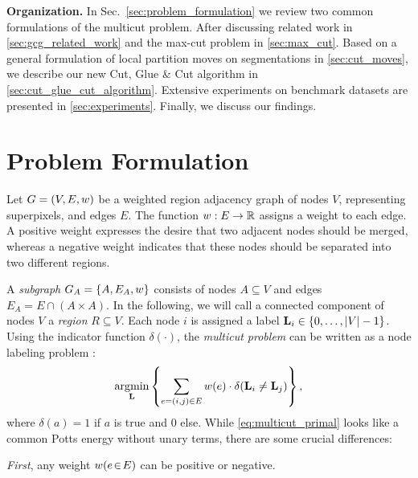 \vspace{0.1cm}
\noindent
\textbf{Organization.}
In Sec.~\ref{sec:problem_formulation} we review two common formulations
of the multicut problem. After discussing related work in
\cref{sec:gcg_related_work} and 
the max-cut problem in \cref{sec:max_cut}.
Based on a general formulation of local partition moves on segmentations in
\cref{sec:cut_moves},
we describe our new Cut, Glue \& Cut algorithm
in \cref{sec:cut_glue_cut_algorithm}. Extensive experiments
on benchmark datasets are presented in \cref{sec:experiments}.
Finally, we discuss our findings.




\section{Problem Formulation\label{sec:problem_formulation}}
Let $G=(V,E, w)$ be a weighted region adjacency graph of
nodes $V$, representing superpixels,
and edges $E$.
%
The function $w : E \rightarrow \mathbb{R}$ assigns a weight to each edge.
A positive weight expresses the desire that two adjacent nodes should
be merged, whereas a negative weight indicates
that these nodes should be separated into two different regions.

A \emph{subgraph} $G_A = \{A, E_A, w\}$ consists
of nodes $A \subseteq V$ and edges $E_A = E\cap (A\times A)$.
%
In the following, we will call a connected component
of nodes $V$ a \emph{region} $R \subseteq V$.
%
Each node $i$ is assigned a 
label $\mathbf{L}_{i} \in \{0, \dots, | V |-1\}$. Using the indicator 
function
$\delta(\cdot)$, the
\emph{multicut problem} can be written as a node labeling problem
\cite{bagon_2011_arxiv}:
%
\begin{align}
\operatorname*{\arg\!\min}_{\mathbf{L}}
    \left\{
    \sum_{ e=(i,j) \in E}
        w(e)
        \cdot \delta( \mathbf{L}_i \neq \mathbf{L}_j )
    \right\},
    \label{eq:multicut_primal}
\end{align}
%
where $\delta(a) = 1$ if $a$ is true and $0$ else.
%
While \eqref{eq:multicut_primal} looks like a common Potts energy without
unary terms, there are some crucial differences:

\noindent
\emph{First}, any weight $w(e\!\in\!E)$ can be positive or negative.

